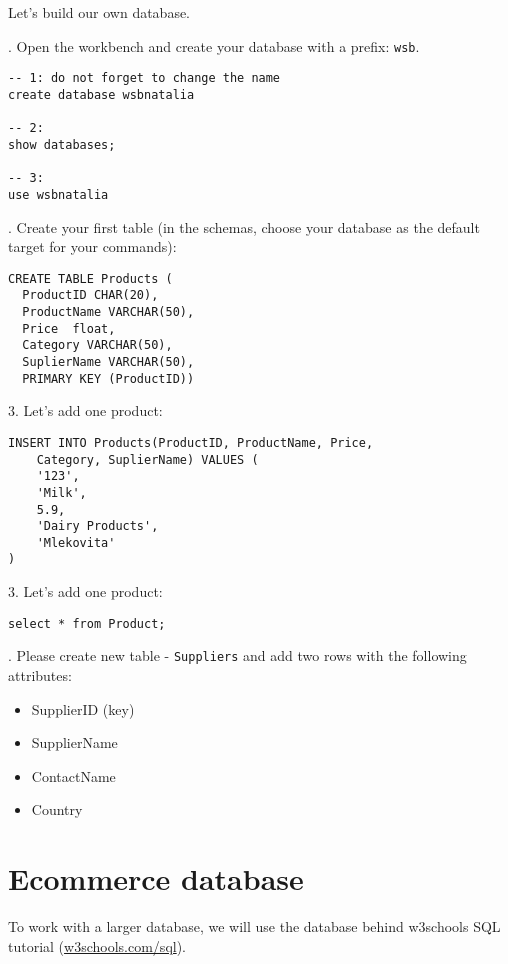\documentclass[12pt, letterpaper]{article}
\begin{document}
Let's build our own database.

. Open the workbench and create your database with a prefix: \verb|wsb|.

\begin{verbatim}
-- 1: do not forget to change the name
create database wsbnatalia

-- 2:
show databases;

-- 3:
use wsbnatalia
\end{verbatim}

. Create your first table (in the schemas, choose your database as the default target for your commands):

\begin{verbatim}
CREATE TABLE Products (
  ProductID CHAR(20),
  ProductName VARCHAR(50),
  Price  float,
  Category VARCHAR(50),
  SuplierName VARCHAR(50),
  PRIMARY KEY (ProductID))
\end{verbatim}

\bigskip

3. Let's add one product:

\begin{verbatim}
INSERT INTO Products(ProductID, ProductName, Price,
    Category, SuplierName) VALUES (
    '123',
    'Milk',
    5.9,
    'Dairy Products',
    'Mlekovita'
)
\end{verbatim}

\bigskip

3. Let's add one product:

\begin{verbatim}
select * from Product;
\end{verbatim}

. Please create new table - \verb|Suppliers| and add two rows with the following attributes:

\begin{itemize}
\item SupplierID (key)
\item SupplierName
\item ContactName
\item Country
\end{itemize}

\section{Ecommerce database}

To work with a larger database, we will use the database behind w3schools SQL tutorial (\href{https://www.w3schools.com/sql/default.asp}{w3schools.com/sql}).
\end{document}
